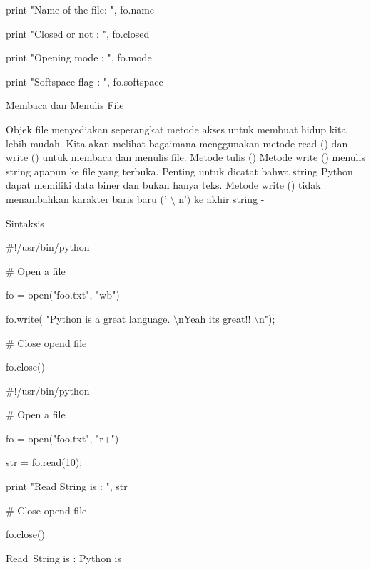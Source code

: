 \noindent 
print "Name of the file: ", fo.name \par
\noindent 
print "Closed or not : ", fo.closed \par
\noindent 
print "Opening mode : ", fo.mode \par
\noindent 
print "Softspace flag : ", fo.softspace \par
\vspace{12pt}
\noindent 
Membaca dan Menulis File \par
\vspace{12pt}
Objek file menyediakan seperangkat metode akses untuk membuat hidup kita lebih mudah. Kita akan melihat bagaimana menggunakan metode read () dan write () untuk membaca dan menulis file. Metode tulis () Metode write () menulis string apapun ke file yang terbuka. Penting untuk dicatat bahwa string Python dapat memiliki data biner dan bukan hanya teks. Metode write () tidak menambahkan karakter baris baru (' $  \setminus  $ n') ke akhir string - \par
\noindent 
Sintaksis \par
\vspace{12pt}
\noindent 
 $  \#  $!/usr/bin/python \par
\vspace{12pt}
\noindent 
 $  \#  $ Open a file \par
\noindent 
fo = open("foo.txt", "wb") \par
\noindent 
fo.write( "Python is a great language. $  \setminus  $nYeah its great!! $  \setminus  $n"); \par
\vspace{12pt}
\noindent 
 $  \#  $ Close opend file \par
\noindent 
fo.close() \par
\noindent 
 $  \#  $!/usr/bin/python \par
\vspace{12pt}
\noindent 
 $  \#  $ Open a file \par
\noindent 
fo = open("foo.txt", "r+") \par
\noindent 
str = fo.read(10); \par
\noindent 
print "Read String is : ", str \par
\vspace{12pt}
\noindent 
 $  \#  $ Close opend file \par
\noindent 
fo.close() \par
\vspace{12pt}
\noindent 
Read~String is :  Python is \par
